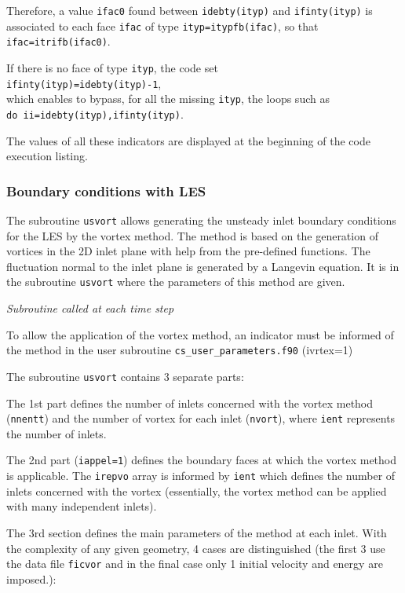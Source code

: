 {{{Therefore, a value \texttt{ifac0} found between \texttt{idebty(ityp)} and
\texttt{ifinty(ityp)} is associated to each face \texttt{ifac} of type
\texttt{ityp=itypfb(ifac)}, so that \texttt{ifac=itrifb(ifac0)}.

If there is no face of type \texttt{ityp}, the code set \\
\texttt{ifinty(ityp)=idebty(ityp)-1},\\
which enables to bypass, for all the missing \texttt{ityp}, the loops such as \\
\texttt{do ii=idebty(ityp),ifinty(ityp)}.

The values of all these indicators are displayed at the beginning of the
code execution listing.

\subsubsection[Boundary conditions with LES]
{Boundary conditions with LES}
\label{sec:prg_usvort}%
The subroutine \texttt{usvort} allows generating the unsteady inlet boundary
conditions for the LES by the vortex method. The method is based on
 the generation of vortices in the 2D inlet plane with help from
the pre-defined functions. The fluctuation normal to the inlet plane
is generated by a Langevin equation. It is in the subroutine \texttt{usvort}
 where the parameters of this method are given.

\noindent
\textit{Subroutine called at each time step}

To allow the application of the vortex method, an indicator must be informed of
the method in the user subroutine \texttt{cs\_user\_parameters.f90} (ivrtex=1)

The subroutine \texttt{usvort} contains 3 separate parts:

\begin{list}{-}{}
\item The 1st part defines the number of inlets concerned with the vortex
method (\texttt{nnentt}) and the number of vortex for each inlet
(\texttt{nvort}), where \texttt{ient} represents the number of inlets.
\item The 2nd part (\texttt{iappel=1}) defines the boundary faces at which the
      vortex method is applicable. The \texttt{irepvo} array is informed
      by \texttt{ient} which defines the number of inlets concerned with the vortex
(essentially, the vortex method can be applied with many independent inlets).
\item The 3rd section defines the main parameters of the method at each inlet.
      With the complexity of any given geometry, 4 cases are distinguished
      (the first 3 use the data file \texttt{ficvor} and in the final case only 1
      initial velocity and energy are imposed.):


\end{list}}}}
